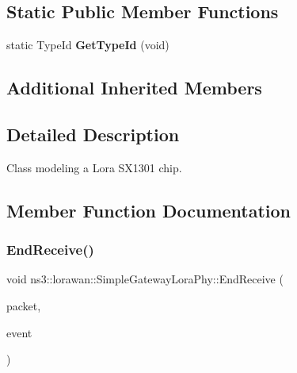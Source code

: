 \subsection*{Static Public Member Functions}
\begin{DoxyCompactItemize}
\item 
\mbox{\label{classns3_1_1lorawan_1_1SimpleGatewayLoraPhy_a98c8d0f68e7c59bbabee2e3282eb4562}} 
static Type\+Id {\bfseries Get\+Type\+Id} (void)
\end{DoxyCompactItemize}
\subsection*{Additional Inherited Members}


\subsection{Detailed Description}
Class modeling a Lora S\+X1301 chip. 

\subsection{Member Function Documentation}
\mbox{\label{classns3_1_1lorawan_1_1SimpleGatewayLoraPhy_aefb2464599926253bfb1003fa14f8fae}} 
\subsubsection{\texorpdfstring{End\+Receive()}{EndReceive()}}
{\footnotesize\ttfamily void ns3\+::lorawan\+::\+Simple\+Gateway\+Lora\+Phy\+::\+End\+Receive (\begin{DoxyParamCaption}\item[{Ptr$<$ Packet $>$}]{packet,  }\item[{Ptr$<$ \hyperlink{classns3_1_1lorawan_1_1LoraInterferenceHelper_1_1Event}{Lora\+Interference\+Helper\+::\+Event} $>$}]{event }\end{DoxyParamCaption})\hspace{0.3cm}{\ttfamily [virtual]}}

